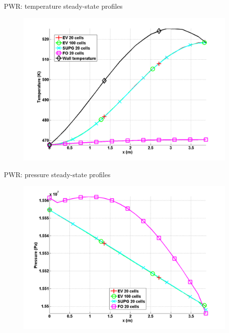 \documentclass[xcolor=dvipsnames,10pt]{beamer}
\begin{document}
\begin{frame}{PWR: temperature steady-state profiles}
\begin{figure}
    \centering
    \includegraphics[width=0.98\textwidth]{plots/PWR_stt_temperature.png}
\end{figure}
\end{frame}
\begin{frame}{PWR: pressure steady-state profiles}
\begin{figure}
    \centering
    \includegraphics[width=0.98\textwidth]{plots/PWR_stt_pressure.png}
\end{figure}
\end{frame}
\end{document}
